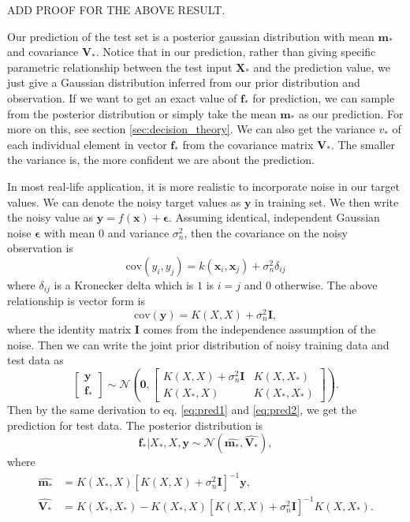 \documentclass[11pt,a4paper]{article}
\theoremstyle{definition}
\numberwithin{equation}{section}
\let\vec\mathbf
\begin{document}
ADD PROOF FOR THE ABOVE RESULT.

Our prediction of the test set is a posterior gaussian distribution with mean $\vec m_*$ and covariance $\vec V_*$.  Notice that in our prediction, rather than giving specific parametric relationship between the test input $\vec X_*$ and the prediction value, we just give a Gaussian distribution inferred from our prior distribution and observation. If we want to get an exact value of $\vec f_*$ for prediction, we can sample from the posterior distribution or simply take the mean $\vec m_*$ as our prediction. For more on this, see section \ref{sec:decision_theory}. We can also get the variance $v_*$ of each individual element in vector  $\vec f_*$ from the covariance matrix $\vec V_*$. The smaller the variance is, the more confident we are about the prediction. 

In most real-life application, it is more realistic to incorporate noise in our target values. We can denote the noisy target values as $\vec y$ in training set. We then write the noisy value as $\vec y = f(\vec x) + \vec\epsilon$. Assuming identical, independent Gaussian noise $\vec \epsilon$ with mean $0$ and variance $\sigma^2_n$, then the covariance on the noisy observation is
\begin{equation*} \label{}
\mathrm{cov} (y_i,y_j) = k(\vec x_i,\vec x_j) + \sigma^2_n \delta_{ij}
\end{equation*}
where $\delta_{ij}$ is a Kronecker delta which is $1$ is $i=j$ and $0$ otherwise. The above relationship is vector form is
\begin{equation} \label{cov_y}
\mathrm{cov} (\vec y) = K(X,X) + \sigma^2_n \vec I,
\end{equation}
where the identity matrix $\vec I$ comes from the independence assumption of the noise. Then we can write the joint prior distribution of noisy training data and test data as
\begin{equation} \label{}
	\begin{bmatrix}
	\vec y\\
	\vec f_*
	\end{bmatrix}
	\sim
	\mathcal{N}\left(\vec 0, 
	\begin{bmatrix}
	K(X,X)+ \sigma^2_n \vec I & K(X,X_*)\\
	K(X_*,X) & K(X_*,X_*)
	\end{bmatrix}
	\right).
\end{equation}
Then by the same derivation to eq. \ref{eq:pred1} and \ref{eq:pred2}, we get the prediction for test data. The posterior distribution is 
\begin{equation} \label{eq:pred3}
	\vec f_* | X_*, X, \vec y \sim \mathcal N (\widehat{\vec m_*}, \widehat{\vec V_*}),
\end{equation}
where
\begin{equation} \label{eq:pred4}
\begin{split}
\widehat{\vec m_* }&= K(X_*,X)[K(X,X)+ \sigma^2_n \vec I]^{-1}\vec y,\\
\widehat{\vec V_*} &= K(X_*,X_*) - K(X_*,X)[K(X,X)+ \sigma^2_n \vec I]^{-1}K(X,X_*).
\end{split}
\end{equation}
\end{document}
